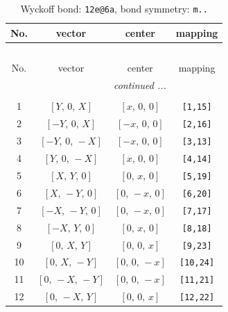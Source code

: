 \documentclass[fleqn,8pt]{jsarticle}
\begin{document}
\begin{longtable}{cccc}
\caption{Wyckoff bond: {\tt 12e@6a}, bond symmetry: {\tt m..}}
 \\
 \hline \hline
No. & vector & center & mapping \\ \hline \endfirsthead

\multicolumn{3}{l}{\tablename\ \thetable{}} \\
 \hline \hline
No. & vector & center & mapping \\ \hline \endhead

 \hline \hline
\multicolumn{3}{r}{\footnotesize\it continued ...} \\ \endfoot

 \hline \hline
\multicolumn{3}{r}{} \\ \endlastfoot

1 & $\left[ Y,\, 0,\, X \right]$ & $\left[ x,\, 0,\, 0 \right]$ & {\tt [1,15]} \\ \hline
2 & $\left[ - Y,\, 0,\, X \right]$ & $\left[ - x,\, 0,\, 0 \right]$ & {\tt [2,16]} \\ \hline
3 & $\left[ - Y,\, 0,\, - X \right]$ & $\left[ - x,\, 0,\, 0 \right]$ & {\tt [3,13]} \\ \hline
4 & $\left[ Y,\, 0,\, - X \right]$ & $\left[ x,\, 0,\, 0 \right]$ & {\tt [4,14]} \\ \hline
5 & $\left[ X,\, Y,\, 0 \right]$ & $\left[ 0,\, x,\, 0 \right]$ & {\tt [5,19]} \\ \hline
6 & $\left[ X,\, - Y,\, 0 \right]$ & $\left[ 0,\, - x,\, 0 \right]$ & {\tt [6,20]} \\ \hline
7 & $\left[ - X,\, - Y,\, 0 \right]$ & $\left[ 0,\, - x,\, 0 \right]$ & {\tt [7,17]} \\ \hline
8 & $\left[ - X,\, Y,\, 0 \right]$ & $\left[ 0,\, x,\, 0 \right]$ & {\tt [8,18]} \\ \hline
9 & $\left[ 0,\, X,\, Y \right]$ & $\left[ 0,\, 0,\, x \right]$ & {\tt [9,23]} \\ \hline
10 & $\left[ 0,\, X,\, - Y \right]$ & $\left[ 0,\, 0,\, - x \right]$ & {\tt [10,24]} \\ \hline
11 & $\left[ 0,\, - X,\, - Y \right]$ & $\left[ 0,\, 0,\, - x \right]$ & {\tt [11,21]} \\ \hline
12 & $\left[ 0,\, - X,\, Y \right]$ & $\left[ 0,\, 0,\, x \right]$ & {\tt [12,22]} \\
\end{longtable}
\renewcommand{\arraystretch}{1.2}
\end{document}

